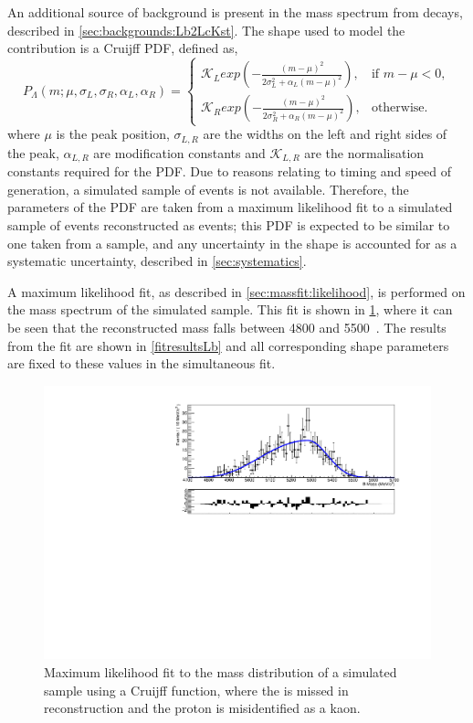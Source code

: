 An additional source of background is present in the \kk mass spectrum from  decays, described in \sect\ref{sec:backgrounds:Lb2LcKst}. The shape used to model the \decay{\Lb}{\Lc\Kstarm} contribution is a Cruijff PDF, defined as,
\begin{equation}
  P_{\Lambda}(m; \mu,\sigma_L,\sigma_R,\alpha_L,\alpha_R)=
\begin{cases}
    \mathcal{K}_{L} exp \left( -\frac{(m-\mu)^2}{2\sigma_L^2 + \alpha_L(m-\mu)^2} \right) ,     & \text{if } m-\mu < 0, \\
    \mathcal{K}_{R} exp \left( -\frac{(m-\mu)^2}{2\sigma_R^2 + \alpha_R(m-\mu)^2} \right) ,     & \text{otherwise.}
\end{cases}
\label{Cruijff}
\end{equation}%
where $\mu$ is the peak position, $\sigma_{L,R}$ are the widths on the left and right sides of the peak, $\alpha_{L,R}$ are modification constants and $\mathcal{K}_{L,R}$ are the normalisation constants required for the PDF. Due to reasons relating to timing and speed of generation, a simulated sample of \decay{\Lb}{\Lc\Kstarm} events is not available. Therefore, the parameters of the PDF are taken from a maximum likelihood fit to a simulated sample of \decay{\Lb}{\Lc\Km} events reconstructed as \decay{\Bm}{\D\Km} events; this PDF is expected to be similar to one taken from a \decay{\Lb}{\Lc\Kstarm} sample, and any uncertainty in the shape is accounted for as a systematic uncertainty, described in \sect\ref{sec:systematics}.

A maximum likelihood fit, as described in \sect\ref{sec:massfit:likelihood}, is performed on the \Bm mass spectrum of the simulated sample. This fit is shown in \fig\ref{Lbfit}, where it can be seen that the reconstructed \Bm mass falls between 4800 and 5500~\mevcc. The results from the fit are shown in \tab\ref{fitresultsLb} and all corresponding shape parameters are fixed to these values in the simultaneous fit.

\begin{figure}[h]
\centering
\includegraphics[width=0.7\linewidth]{figures/backgrounds/Lb2LcKst.pdf}
\caption{Maximum likelihood fit to the mass distribution of a simulated  sample using a Cruijff function, where the \pip is missed in reconstruction and the proton is misidentified as a kaon.}
\label{Lbfit}
\end{figure}

